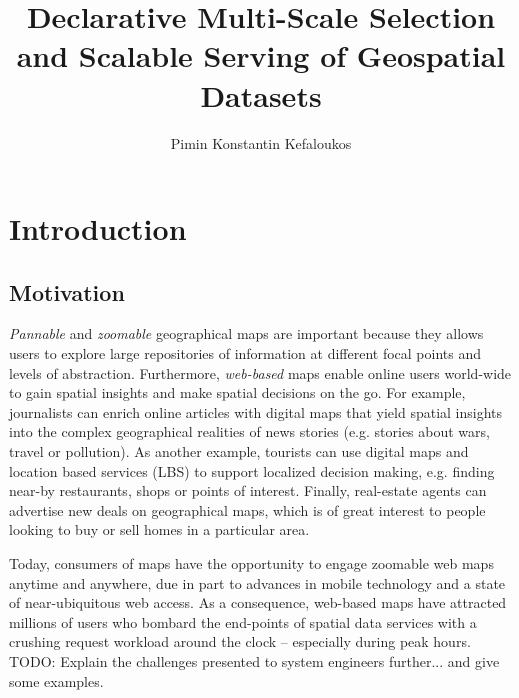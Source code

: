 \documentclass[11pt, oneside]{report}   	%
\title{Declarative Multi-Scale Selection and Scalable Serving of Geospatial Datasets}
\author{Pimin Konstantin Kefaloukos}
\begin{document}
\maketitle

\tableofcontents

\chapter{Introduction}


\section{Motivation}
\emph{Pannable} and \emph{zoomable} geographical maps are important because they allows users to explore large repositories of information at different focal points and levels of abstraction. Furthermore, \emph{web-based} maps enable online users world-wide to gain spatial insights and make spatial decisions on the go. For example, journalists can enrich online articles with digital maps that yield spatial insights into the complex geographical realities of news stories (e.g. stories about wars, travel or pollution). As another example, tourists can use digital maps and location based services (LBS) to support localized decision making, e.g. finding near-by restaurants, shops or points of interest. Finally, real-estate agents can advertise new deals on geographical maps, which is of great interest to people looking to buy or sell homes in a particular area. %

Today, consumers of maps have the opportunity to engage zoomable web maps anytime and anywhere, due in part to advances in mobile technology and a state of near-ubiquitous web access. As a consequence, web-based maps have attracted millions of users who bombard the end-points of spatial data services with a crushing request workload around the clock -- especially during peak hours. TODO: Explain the challenges presented to system engineers further... and give some examples.
\end{document}
